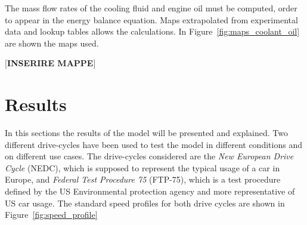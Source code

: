 The mass flow rates of the cooling fluid and engine oil must be computed, order to appear in the energy balance equation. Maps extrapolated from experimental data and lookup tables allows the calculations. In Figure~\ref{fig:maps_coolant_oil} are shown the maps used.

[\textbf{INSERIRE MAPPE}]

\section{Results}

In this sections the results of the model will be presented and explained. Two different drive-cycles have been used to test the model in different conditions and on different use cases. The drive-cycles considered are the \emph{New European Drive Cycle} (NEDC), which is supposed to represent the typical usage of a car in Europe, and \emph{Federal Test Procedure 75} (FTP-75), which is a test procedure defined by the US Environmental protection agency and more representative of US car usage. The standard speed profiles for both drive cycles are shown in Figure~\ref{fig:speed_profile}


